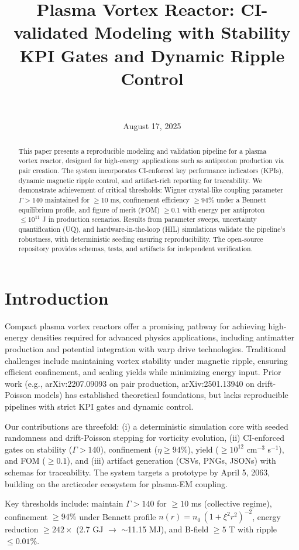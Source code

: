 \documentclass[11pt]{article}
\title{Plasma Vortex Reactor: CI-validated Modeling with Stability KPI Gates and Dynamic Ripple Control}
\author{\authorname\\\texttt{\authoremail}}
\date{August 17, 2025}
\begin{document}
\maketitle
\begin{abstract}
This paper presents a reproducible modeling and validation pipeline for a plasma vortex reactor, designed for high-energy applications such as antiproton production via pair creation. The system incorporates CI-enforced key performance indicators (KPIs), dynamic magnetic ripple control, and artifact-rich reporting for traceability. We demonstrate achievement of critical thresholds: Wigner crystal-like coupling parameter $\Gamma > 140$ maintained for $\geq 10$ ms, confinement efficiency $\geq 94\%$ under a Bennett equilibrium profile, and figure of merit (FOM) $\geq 0.1$ with energy per antiproton $\leq 10^{11}$ J in production scenarios. Results from parameter sweeps, uncertainty quantification (UQ), and hardware-in-the-loop (HIL) simulations validate the pipeline's robustness, with deterministic seeding ensuring reproducibility. The open-source repository provides schemas, tests, and artifacts for independent verification.
\end{abstract}
\section{Introduction}
Compact plasma vortex reactors offer a promising pathway for achieving high-energy densities required for advanced physics applications, including antimatter production and potential integration with warp drive technologies. Traditional challenges include maintaining vortex stability under magnetic ripple, ensuring efficient confinement, and scaling yields while minimizing energy input. Prior work (e.g., arXiv:2207.09093 on pair production, arXiv:2501.13940 on drift-Poisson models) has established theoretical foundations, but lacks reproducible pipelines with strict KPI gates and dynamic control.

Our contributions are threefold: (i) a deterministic simulation core with seeded randomness and drift-Poisson stepping for vorticity evolution, (ii) CI-enforced gates on stability ($\Gamma > 140$), confinement ($\eta \geq 94\%$), yield ($\geq 10^{12}$ cm$^{-3}$ s$^{-1}$), and FOM ($\geq 0.1$), and (iii) artifact generation (CSVs, PNGs, JSONs) with schemas for traceability. The system targets a prototype by April 5, 2063, building on the arcticoder ecosystem for plasma-EM coupling.

Key thresholds include: maintain $\Gamma > 140$ for $\geq 10$ ms (collective regime), confinement $\geq 94\%$ under Bennett profile $n(r)=n_0\,(1+\xi^2 r^2)^{-2}$, energy reduction $\geq 242\times$ (2.7 GJ $\to$ $\sim$11.15 MJ), and B-field $\geq 5$ T with ripple $\leq 0.01\%$.
\end{document}
